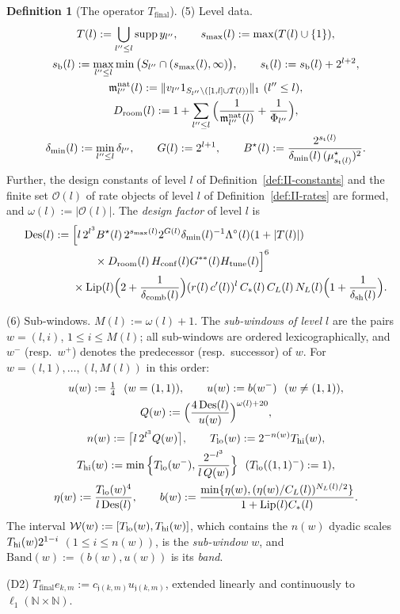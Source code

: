 \documentclass[10pt]{amsart}
\theoremstyle{definition}
\newtheorem{definition}[theorem]{Definition}
\theoremstyle{remark}
\newcommand{\supp}{\operatorname{supp}}
\newcommand{\N}{\mathbb N}
\begin{document}
\begin{definition}[The operator $T_{\mathrm{final}}$]
\smallskip\noindent\textup{(5) Level data.}
\begin{gather*}
 T(l):=\bigcup_{l''\le l}\supp y_{l''},\qquad
 s_{\max}(l):=\max(T(l)\cup\{1\}),\\
 s_{\rm b}(l):=\max_{l''\le l}\min\big(S_{l''}\cap(s_{\max}(l),\infty)\big),
 \qquad s_{\rm t}(l):=s_{\rm b}(l)+2^{l+2},\\
 \mathfrak m^{\rm nat}_{l''}(l):=\|v_{l''}1_{S_{l''}\setminus([1,l]\cup
 T(l))}\|_1\ (l''\le l),\\
 D_{\rm room}(l):=1+\sum_{l''\le l}\Big(\frac1{\mathfrak m^{\rm nat}_{l''}(l)}
 +\frac1{\Phi_{l''}}\Big),\\
 \delta_{\min}(l):=\min_{l''\le l}\delta_{l''},\qquad G(l):=2^{l+1},\qquad
 B^\star(l):=\frac{2^{s_{\rm t}(l)}}{\delta_{\min}(l)\,
 (\mu^\star_{s_{\rm t}(l)})^2} .
\end{gather*}
Further, the design constants of level $l$ of
Definition~\ref{def:II-constants} and the finite set $\mathcal O(l)$ of
rate objects of level $l$ of Definition~\ref{def:II-rates} are formed, and
$\omega(l):=|\mathcal O(l)|$.  The \emph{design factor} of level $l$ is
\begin{align*}
 \mathrm{Des}(l):={}&\Big[l\,2^{l^3}B^\star(l)\,2^{s_{\max}(l)}2^{G(l)}
 \delta_{\min}(l)^{-1}\Lambda^\circ(l)(1+|T(l)|)\\
 &\qquad\times D_{\rm room}(l)\,H_{\rm conf}(l)
 G^{**}(l)H_{\rm tune}(l)\Big]^6\\
 &\times\mathrm{Lip}(l)\Big(2+\frac1{\delta_{\rm comb}(l)}\Big)
 (r(l)\,c'(l))^l\,C_*(l)\,C_L(l)\,N_L(l)\Big(1+\frac1{\delta_{\rm sh}(l)}
 \Big).
\end{align*}

\smallskip\noindent\textup{(6) Sub-windows.}  $M(l):=\omega(l)+1$.  The
\emph{sub-windows of level $l$} are the pairs $w=(l,i)$,
$1\le i\le M(l)$; all sub-windows are ordered lexicographically, and
$w^-$ (resp.\ $w^+$) denotes the predecessor (resp.\ successor) of $w$.
For $w=(l,1),\dots,(l,M(l))$ in this order:
\begin{gather*}
 u(w):=\tfrac14\ \ (w=(1,1)),\qquad u(w):=b(w^-)\ \ (w\ne(1,1)),\\
 Q(w):=\Big(\frac{4\,\mathrm{Des}(l)}{u(w)}\Big)^{\omega(l)+20},\\
 n(w):=\big\lceil l\,2^{l^3}Q(w)\big\rceil,\qquad
 T_{\rm lo}(w):=2^{-n(w)}T_{\rm hi}(w),\\
 T_{\rm hi}(w):=\min\Big\{T_{\rm lo}(w^-),\frac{2^{-l^3}}{l\,Q(w)}\Big\}
 \ \ (T_{\rm lo}((1,1)^-):=1),\\
 \eta(w):=\frac{T_{\rm lo}(w)^4}{l\,\mathrm{Des}(l)},\qquad
 b(w):=\frac{\min\{\eta(w),(\eta(w)/C_L(l))^{N_L(l)/2}\}}
 {1+\mathrm{Lip}(l)C_*(l)} .
\end{gather*}
The interval $\mathcal W(w):=[T_{\rm lo}(w),T_{\rm hi}(w)]$, which contains
the $n(w)$ dyadic scales $T_{\rm hi}(w)2^{1-i}$ $(1\le i\le n(w))$, is the
\emph{sub-window} $w$, and $\mathrm{Band}(w):=(b(w),u(w))$ is its
\emph{band}.

\smallskip\noindent\textup{(D2)} $T_{\mathrm{final}}e_{k,m}:=
c_{\mathfrak j(k,m)}u_{\mathfrak j(k,m)}$, extended linearly and
continuously to $\ell_1(\N\times\N)$.
\end{definition}
\end{document}
